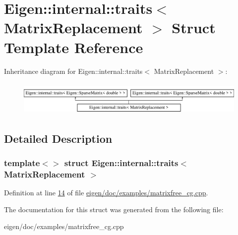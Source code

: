 \hypertarget{struct_eigen_1_1internal_1_1traits_3_01_matrix_replacement_01_4}{}\section{Eigen\+:\+:internal\+:\+:traits$<$ Matrix\+Replacement $>$ Struct Template Reference}
\label{struct_eigen_1_1internal_1_1traits_3_01_matrix_replacement_01_4}
Inheritance diagram for Eigen\+:\+:internal\+:\+:traits$<$ Matrix\+Replacement $>$\+:\begin{figure}[H]
\begin{center}
\leavevmode
\includegraphics[height=1.686747cm]{struct_eigen_1_1internal_1_1traits_3_01_matrix_replacement_01_4}
\end{center}
\end{figure}


\subsection{Detailed Description}
\subsubsection*{template$<$$>$\newline
struct Eigen\+::internal\+::traits$<$ Matrix\+Replacement $>$}



Definition at line \hyperlink{eigen_2doc_2examples_2matrixfree__cg_8cpp_source_l00014}{14} of file \hyperlink{eigen_2doc_2examples_2matrixfree__cg_8cpp_source}{eigen/doc/examples/matrixfree\+\_\+cg.\+cpp}.



The documentation for this struct was generated from the following file\+:\begin{DoxyCompactItemize}
\item 
eigen/doc/examples/matrixfree\+\_\+cg.\+cpp\end{DoxyCompactItemize}
